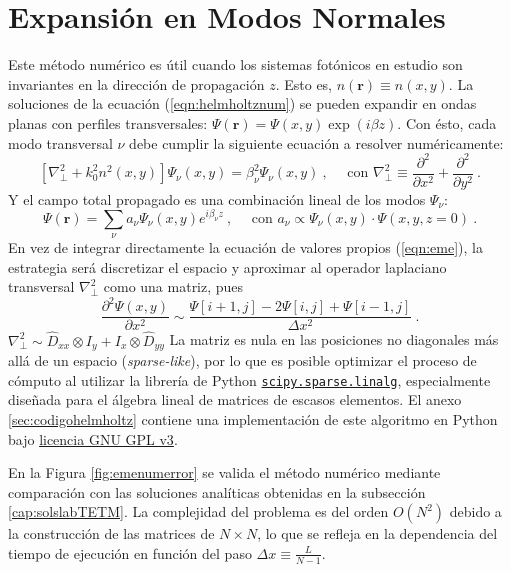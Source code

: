 \section{Expansión en Modos Normales \label{cap:eme}}
Este método numérico es útil cuando los sistemas fotónicos en estudio son invariantes en la dirección de propagación $z$. Esto es, $n(\textbf{r})\equiv n(x,y)$. La soluciones de la ecuación (\ref{eqn:helmholtznum}) se pueden expandir en ondas planas con perfiles transversales: $\Psi(\textbf{r}) = \Psi(x,y) \exp({i\beta z})$. Con ésto, cada modo transversal $\nu$ debe cumplir la siguiente ecuación a resolver numéricamente:
\begin{equation}
	\left[\nabla_\perp^2 + k_0^2 n^2(x,y)\right]\Psi_\nu(x,y) = \beta_\nu^2\Psi_\nu(x,y) \ , \quad\text{ con } \nabla_\perp^2 \equiv \frac{\partial^2}{\partial x^2} + \frac{\partial^2}{\partial y^2} \ .
	\label{eqn:eme}
\end{equation}
Y el campo total propagado es una combinación lineal de los modos $\Psi_\nu$: 
\begin{equation}
	\Psi(\textbf{r}) = \sum_\nu a_\nu \Psi_\nu(x,y) e^{i\beta_\nu z} \ , \quad\text{ con } a_\nu \propto \Psi_\nu(x,y) \cdot \Psi(x, y, z=0) \ . \label{eqn:emedin}
\end{equation}
En vez de integrar directamente la ecuación de valores propios (\ref{eqn:eme}), la estrategia será discretizar el espacio y aproximar al operador laplaciano transversal $\nabla_\perp^2$ como una matriz, pues $$\frac{\partial^2 \Psi(x,y)}{\partial x^2} \sim \frac{\Psi[i+1,j]-2\Psi[i,j]+\Psi[i-1,j]}{\Delta x ^2}  \ .
$$
$\nabla^2_\perp \sim \hat{D}_{xx} \otimes I_y + I_x \otimes \hat{D}_{yy}$
La matriz es nula en las posiciones no diagonales más allá de un espacio (\textit{sparse-like}), por lo que es posible optimizar el proceso de cómputo al utilizar la librería de Python \href{https://docs.scipy.org/doc/scipy/reference/sparse.linalg.html}{\color{magenta}\texttt{scipy.sparse.linalg}}, especialmente diseñada para el álgebra lineal de matrices de escasos elementos. El anexo \ref{sec:codigohelmholtz} contiene una implementación de este algoritmo en Python bajo \href{https://www.gnu.org/licenses/gpl-3.0.html}{\color{magenta}licencia GNU GPL v3}.

En la Figura \ref{fig:emenumerror} se valida el método numérico mediante comparación con las soluciones analíticas obtenidas en la subsección \ref{cap:solslabTETM}. La complejidad del problema es del orden $O(N^2)$ debido a la construcción de las matrices de $N\times N$, lo que se refleja en la dependencia del tiempo de ejecución en función del paso $\Delta x \equiv \frac{L}{N-1}$.


